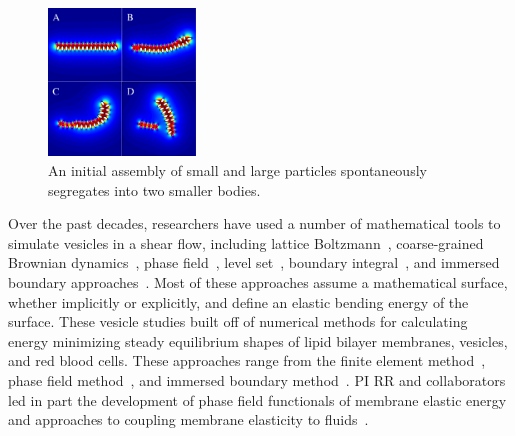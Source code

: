 \begin{figure}
\centerline{\includegraphics[width=0.35\textwidth]{figures/PW_fig2.pdf}}
  \vspace{-8pt}
  \caption{\label{fig:demixing} \footnotesize An initial assembly of
  small and large particles spontaneously segregates into two smaller
  bodies.}
\end{figure}
Over the past decades, researchers have used a number of mathematical
tools to simulate vesicles in a shear flow, including lattice
Boltzmann~\cite{KaouiHartingMisbah2011_PRE}, coarse-grained Brownian
dynamics~\cite{NoguchiTakasu2002_BJ}, phase
field~\cite{DuLiuWang2004_JCP,BibenKassnerMisbah2005_PRE}, level
set~\cite{DoyeuxGuyotChabannesEtAl2013_JCAM}, boundary
integral~\cite{Shravan09,Rahimian15}, and immersed boundary
approaches~\cite{KimLai2010_JCP,KimLai2012_PRE,HuLaiSeolEtAl2016_JCP}.
Most of these approaches assume a mathematical surface, whether
implicitly or explicitly, and define an elastic bending energy of the
surface. These vesicle studies built off of numerical methods for
calculating energy minimizing steady equilibrium shapes of lipid bilayer
membranes, vesicles, and red blood cells. These approaches range from
the finite element method~\cite{Bartels,Peng13,RyKlYaCo16,Sinha15},
phase field method~\cite{Du05,QiangDu08,Lowengrub13}, and immersed
boundary method~\cite{Hu,Hu13, KimLai2010_JCP}. PI RR and collaborators
led in part the development of phase field functionals of membrane
elastic energy and approaches to coupling membrane elasticity to
fluids~\cite{0951-7715-18-3-016,Du05,DuEuler,QiangDu09}.



